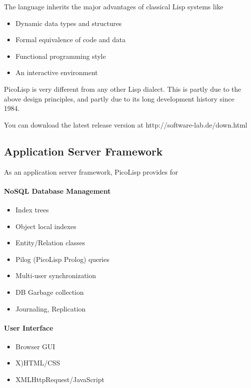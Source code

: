 The language inherits the major advantages of classical Lisp systems like
\begin{itemize}
\item Dynamic data types and structures
\item Formal equivalence of code and data
\item Functional programming style
\item An interactive environment
\end{itemize}

PicoLisp is very different from any other Lisp dialect. This is partly
due to the above design principles, and partly due to its long
development history since 1984.

You can download the latest release version at
http://software-lab.de/down.html

\subsection{Application Server Framework}
\label{sec:readme-application-server-framework}

As an application server framework, PicoLisp provides for

\paragraph{NoSQL Database Management}
\label{par:readme-nosql-database-management}

  \begin{itemize}
    \item Index trees
    \item Object local indexes
    \item Entity/Relation classes
    \item Pilog (PicoLisp Prolog) queries
    \item Multi-user synchronization
    \item DB Garbage collection
    \item Journaling, Replication
  \end{itemize}

\paragraph{User Interface}
\label{par:readme-user-interface}

  \begin{itemize}
    \item Browser GUI
     \item X)HTML/CSS
     \item XMLHttpRequest/JavaScript
  \end{itemize}

